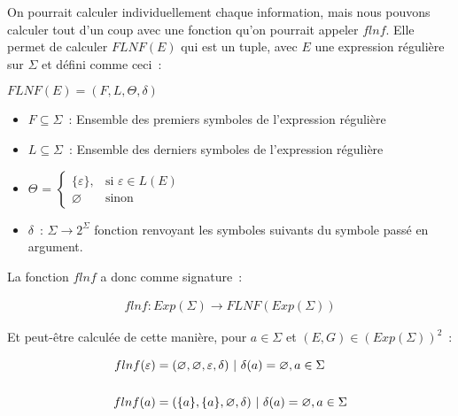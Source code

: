 On pourrait calculer individuellement chaque information, mais nous pouvons
calculer tout d'un coup avec une fonction qu'on pourrait appeler \(flnf\). Elle
permet de calculer \(FLNF(E)\) qui est un tuple, avec \(E\) une expression
régulière sur \(\Sigma\) et défini comme ceci~:

\vphantom{}

\begin{center}
    \(FLNF(E) = (F, L, \Theta, \delta)\)

    \begin{itemize}
        \item[\textbullet] \(F \subseteq \Sigma\)~: Ensemble des premiers
            symboles de l'expression régulière

            \vphantom{}

        \item[\textbullet] \(L \subseteq \Sigma\)~: Ensemble des derniers
            symboles de l'expression régulière

            \vphantom{}

        \item[\textbullet] \(\Theta\) =
            \(
            \begin{cases}
                \{ \varepsilon \}, & \text{si } \varepsilon \in L(E) \\
                \varnothing        & \text{sinon}
            \end{cases}
            \)

            \vphantom{}

        \item[\textbullet] \(\delta\)~: \(\Sigma \to 2^{\Sigma}\) fonction renvoyant les symboles suivants du symbole passé en
            argument.
    \end{itemize}
\end{center}

La fonction \(flnf\) a donc comme signature~:

\begin{align*}
    flnf: Exp(\Sigma) \to FLNF(Exp(\Sigma))
\end{align*}

Et peut-être calculée de cette manière, pour \(a \in \Sigma\) et \((E, G) \in
(Exp(\Sigma))^2\)~:

\begin{align*}
    flnf(\varepsilon) & = (\varnothing, \varnothing, \varepsilon, \delta) ~|~
    \delta(a) = \varnothing, a \in \Sigma                                     \\
    \vphantom{} \notag                                                        \\
    flnf(a) & = (\{a\}, \{a\}, \varnothing, \delta) ~|~ \delta(a) =
    \varnothing, a \in \Sigma
\end{align*}

